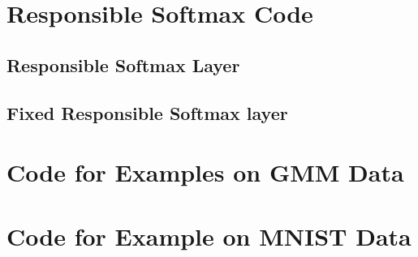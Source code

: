 



\chapter{Responsible Softmax Code}\label{app:RScode}
\section{Responsible Softmax Layer}\label{code:RSlayer}







\section{Fixed Responsible Softmax layer}\label{code:fixedRSLayer}



\chapter{Code for Examples on GMM Data}\label{app:GMMexample}






\chapter{Code for Example on MNIST Data}\label{app:MNISTexample}




\begin{verbatim}


\end{verbatim}